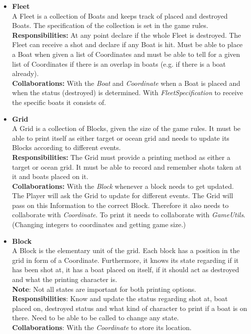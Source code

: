 \documentclass{article}
\begin{document}
\begin{itemize}
    \item \textbf{Fleet}\\
    A Fleet is a collection of Boats and keeps track of placed and destroyed Boats. The specification of the collection is set in the game rules.\\
    \textbf{Responsibilities:} At any point declare if the whole Fleet is destroyed. The Fleet can receive a shot and declare if any Boat is hit. Must be able to place a Boat when given a list of Coordinates and must be able to tell for a given list of Coordinates if there is an overlap in boats (e.g. if there is a boat already).\\
    \textbf{Collaborations:} With the \textit{Boat} and \textit{Coordinate} when a Boat is placed and when the status (destroyed) is determined. With \textit{FleetSpecification} to receive the specific boats it consists of.
    
    \item \textbf{Grid}\\
    A Grid is a collection of Blocks, given the size of the game rules. It must be able to print itself as either target or ocean grid and needs to update its Blocks according to different events.\\
    \textbf{Responsibilities:} The Grid must provide a printing method as either a target or ocean grid. It must be able to record and remember shots taken at it and boats placed on it.\\
    \textbf{Collaborations:} With the \textit{Block} whenever a block needs to get updated. The Player will ask the Grid to update for different events. The Grid will pass on this Information to the correct Block. Therefore it also needs to collaborate with \textit{Coordinate}. To print it needs to collaborate with \textit{GameUtils}. (Changing integers to coordinates and getting game size.)
    
    \item \textbf{Block}\\
    A Block is the elementary unit of the grid. Each block has a position in the grid in form of a Coordinate. Furthermore, it knows its state regarding if it has been shot at, it has a boat placed on itself, if it should act as destroyed and what the printing character is.\\
    \textbf{Note}: Not all states are important for both printing options.\\
    \textbf{Responsibilities}: Know and update the status regarding shot at, boat placed on, destroyed status and what kind of character to print if a boat is on there. Need to be able to be called to change any state.\\
    \textbf{Collaborations}: With the \textit{Coordinate} to store its location.
    

\end{itemize}
\end{document}
